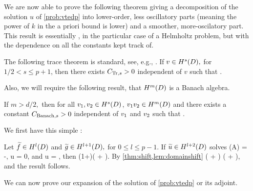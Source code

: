 We are now able to prove the following theorem giving a decomposition of the solution $u$ of \cref{prob:vtedp} into lower-order, less oscillatory parts (meaning the power of $k$ in the a priori bound is lower) and a smoother, more-oscilatory part. This result is essentially \cite[Theorem 1]{ChNi:18a}, in the particular case of a Helmholtz problem, but with the dependence on all the constants kept track of.

The following trace theorem is standard, see, e.g., \cite[Theorem 3.37]{Mc:00}.
\label{thm:trace}
If $v \in \HsD,$ for $1/2 < s \leq p+1$, then there exists $C_{\mathrm{Tr},s} > 0$ independent of $v$ such that
\beqs
{} \leq \CTrs {}.
\eeqs
\enth

Also, we will require the following result, that $\HmD$ is a Banach algebra.

\label{thm:banachalg}
If $m > d/2,$ then for all $\vo, \vt \in \HsD$, $\vo\vt \in \HmD$ and there exists a constant $C_{\mathrm{Banach},s} > 0$ independent of $v_{1}$ and $v_{2}$ such that
\beqs
\NHsD{\vo\vt} \leq {} \NHsD{\vo}\NHsD{\vt}.
\eeqs
\enth

We first have this simple :

\ble\label{lem:domainshift}
Let $\ftilde \in \HlD$ and $\gtilde \in \HlpoD,$ for $0 \leq l \leq p-1$. If $\utilde \in \HlptD$ solves
\beqs
\grad \cdot \mleft(A\grad \utilde\mright) = -\ftilde,
\eeqs
\beqs \trGD u = 0,
\eeqs
and
\beqs
\dn u = \gtilde,
\eeqs
then
\beqs
\NHlptD{\utilde} \leq \CAl\mleft(1+\CTrlpo\mright)\mleft(\NHlD{\ftilde} + \NHlpoD{\gtilde}\mright).
\eeqs
\ele
{}
By \cref{thm:shift,lem:domainshift}
\beqs
\NHlptD{\utilde} \leq \CAl \mleft(\NHlD{\ftilde} + \NHlphGI{\gtilde}\mright) \leq \CAl \mleft(\NHlD{\ftilde} + \CTrs\NHlpoD{\gtilde}\mright),
\eeqs
and the result follows.
\epf

We can now prove our expansion of the solution of \cref{prob:vtedp} or its adjoint.

